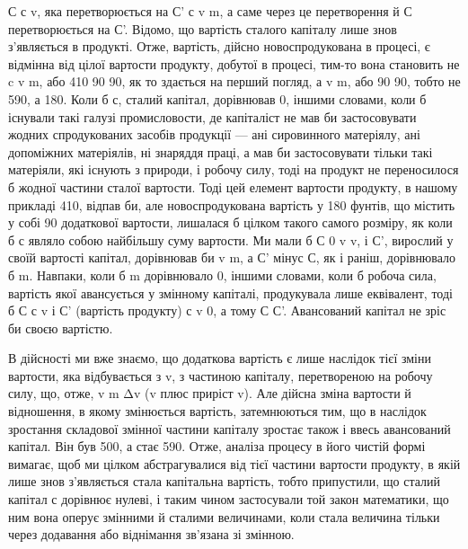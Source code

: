 С \deq{} с \dplus{} v, яка перетворюється на С' \deq{} с \dplus{} v \dplus{} m, а саме через це
перетворення й С перетворюється на С'. Відомо, що вартість сталого
капіталу лише знов з’являється в продукті. Отже, вартість,
дійсно новоспродукована в процесі, є відмінна від цілої вартости
продукту, добутої в процесі, тим-то вона становить не
c \dplus{} v \dplus{} m, або 410 \dplus{} 90 \dplus{} 90, як то здається на перший погляд, а v \dplus{} m, або
90 \dplus{} 90, тобто не 590, а 180. Коли б с, сталий капітал,
дорівнював 0, іншими словами, коли б існували такі галузі промисловости,
де капіталіст не мав би застосовувати жодних спродукованих
засобів продукції — ані сировинного матеріялу, ані
допоміжних матеріялів, ні знаряддя праці, а мав би застосовувати
тільки такі матеріяли, які існують з природи, і робочу
силу, тоді на продукт не переносилося б жодної частини сталої
вартости. Тоді цей елемент вартости продукту, в нашому прикладі
410, відпав би, але новоспродукована вартість
у 180 фунтів, що містить у собі 90 додаткової
вартости, лишалася б цілком такого самого розміру, як коли б
с являло собою найбільшу суму вартости. Ми мали б С \deq{} 0 \dplus{} v \deq{} v,
і С', вирослий у своїй вартості капітал, дорівнював би v \dplus{} m, а
С' мінус С, як і раніш, дорівнювало б m. Навпаки, коли б m дорівнювало
0, іншими словами, коли б робоча сила, вартість якої
авансується у змінному капіталі, продукувала лише еквівалент,
тоді б С \deq{} с \dplus{} v і С' (вартість продукту) \deq{} с \dplus{} v \dplus{} 0, а тому С \deq{} С'.
Авансований капітал не зріс би своєю вартістю.

В дійсності ми вже знаємо, що додаткова вартість є лише наслідок
тієї зміни вартости, яка відбувається з v, з частиною капіталу,
перетвореною на робочу силу, що, отже, v \dplus{} m \deq{} Δv (v плюс
приріст v). Але дійсна зміна вартости й відношення, в якому
змінюється вартість, затемнюються тим, що в наслідок зростання
складової змінної частини капіталу зростає також і ввесь авансований
капітал. Він був 500, а стає 590. Отже, аналіза процесу в його
чистій формі вимагає, щоб ми цілком абстрагувалися від тієї
частини вартости продукту, в якій лише знов з’являється стала
капітальна вартість, тобто припустили, що сталий капітал с
дорівнює нулеві, і таким чином застосували той закон математики,
що ним вона оперує змінними й сталими величинами, коли
стала величина тільки через додавання або віднімання зв’язана
зі змінною.
